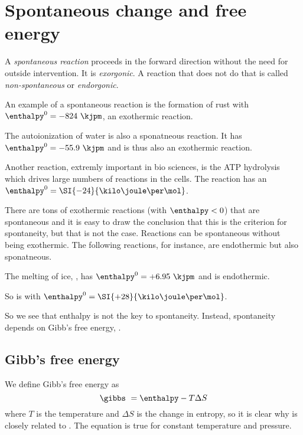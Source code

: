 \documentclass[../mit-general-chemistry.tex]{subfiles}
\begin{document}
\chapter{Spontaneous change and free energy}



A {\em spontaneous reaction} proceeds in the forward direction without
the need for outside intervention. It is {\em exorgonic}. A reaction
that does not do that is called {\em non-spontaneous} or {\em
  endorgonic}.

An example of a spontaneous reaction is the formation of rust
 with $\enthalpy^0 =
-824~\kjpm$, an exothermic reaction.


The autoionization of water  is
also a sponatneous reaction. It has $\enthalpy^0 = -55.9~\kjpm$ and is
thus also an exothermic reaction.

Another reaction, extremly important in bio sciences, is the ATP
hydrolysis  which drives large numbers of reactions in the cells. The
reaction has an $\enthalpy^0 = \SI{-24}{\kilo\joule\per\mol}$.

There are tons of exothermic reactions (with $\enthalpy < 0$) that are
spontaneous and it is easy to draw the conclusion that this is the
criterion for spontaneity, but that is not the case. Reactions can be
spontaneous without being exothermic. The following reactions, for
instance, are endothermic but also sponatneous.

The melting of ice, , has $\enthalpy^0 =
+6.95~\kjpm$ and is endothermic.

So is  with $\enthalpy^0 =
\SI{+28}{\kilo\joule\per\mol}$.

So we see that enthalpy is not the key to spontaneity. Instead,
spontaneity depends on Gibb's free energy, \gibbs.





\section{Gibb's free energy}



We define Gibb's free energy as
\begin{equation}\label{eq:gibbs}
  \gibbs\ = \enthalpy - T \Delta S
\end{equation}
where $T$ is the temperature and $\Delta S$ is the change in entropy,
so it is clear why \enthalpy is closely related to \gibbs. The
equation is true for constant temperature and pressure.
\end{document}
